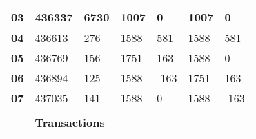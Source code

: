 \documentclass[../NFTComp_IEEE.tex]{subfiles}
\begin{document}
\begin{table}[ht]
{\begin{tabular}{lllllll}
            \multicolumn{1}{|l|}{\textbf{03}}                  & \multicolumn{1}{l|}{436337}                                                        & \multicolumn{1}{l|}{6730}               & \multicolumn{1}{l|}{1007}               & \multicolumn{1}{l|}{0}          & \multicolumn{1}{l|}{1007}            & \multicolumn{1}{l|}{0}          \\ \hline
            \multicolumn{1}{|l|}{\textbf{04}}                  & \multicolumn{1}{l|}{436613}                                                        & \multicolumn{1}{l|}{276}                & \multicolumn{1}{l|}{1588}               & \multicolumn{1}{l|}{581}        & \multicolumn{1}{l|}{1588}            & \multicolumn{1}{l|}{581}        \\ \hline
            \multicolumn{1}{|l|}{\textbf{05}}                  & \multicolumn{1}{l|}{436769}                                                        & \multicolumn{1}{l|}{156}                & \multicolumn{1}{l|}{1751}               & \multicolumn{1}{l|}{163}        & \multicolumn{1}{l|}{1588}            & \multicolumn{1}{l|}{0}          \\ \hline
            \multicolumn{1}{|l|}{\textbf{06}}                  & \multicolumn{1}{l|}{436894}                                                        & \multicolumn{1}{l|}{125}                & \multicolumn{1}{l|}{1588}               & \multicolumn{1}{l|}{-163}       & \multicolumn{1}{l|}{1751}            & \multicolumn{1}{l|}{163}        \\ \hline
            \multicolumn{1}{|l|}{\textbf{07}}                  & \multicolumn{1}{l|}{437035}                                                        & \multicolumn{1}{l|}{141}                & \multicolumn{1}{l|}{1588}               & \multicolumn{1}{l|}{0}          & \multicolumn{1}{l|}{1588}            & \multicolumn{1}{l|}{-163}       \\ \hline
                                                               &                                                                                    &                                         &                                         &                                 &                                      &
            \\
            \cline{2-7}
            \multicolumn{1}{c|}{}                              & \multicolumn{6}{l|}{\textbf{Transactions}}                                                                                                                                                                                                                                        \\ \cline{2-7}

\end{tabular}}
\end{table}
\end{document}
